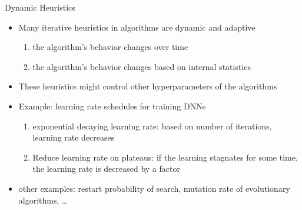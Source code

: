 \begin{frame}[c]{Dynamic Heuristics}
	
	\begin{itemize}
		\item Many iterative heuristics in algorithms are dynamic and adaptive
		\begin{enumerate}
			\item the algorithm's behavior changes over time
			\item the algorithm's behavior changes based on internal statistics
		\end{enumerate}
		\medskip
		\pause
		\item These heuristics might control other hyperparameters of the algorithms
		\pause
		\smallskip
		\item Example: learning rate schedules for training DNNs
		\begin{enumerate}
			\item exponential decaying learning rate: based on number of iterations, learning rate decreases
			\pause
			\item Reduce learning rate on plateaus: if the learning stagnates for some time, the learning rate is decreased by a factor
		\end{enumerate}
		\pause
		\smallskip
		\item other examples: restart probability of search, mutation rate of evolutionary algorithms, \ldots  
		
	\end{itemize}
	
\end{frame}
